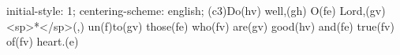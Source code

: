 initial-style: 1;
centering-scheme: english;
(c3)Do(hv) well,(gh) O(fe) Lord,(gv) <sp>*</sp>(,) un(f)to(gv) those(fe) who(fv) are(gv) good(hv) and(fe) true(fv) of(fv) heart.(e)
